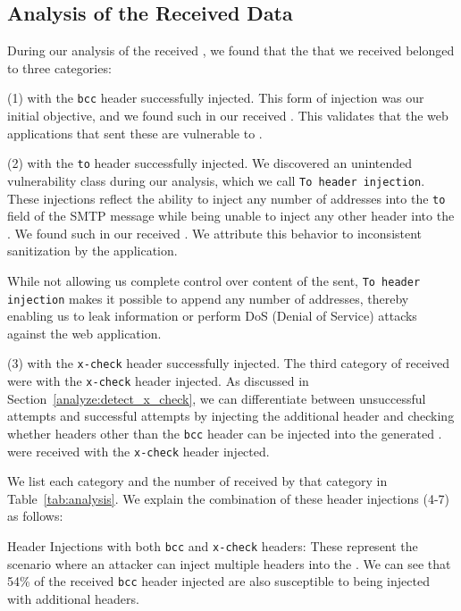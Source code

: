 \subsection{Analysis of the Received \Email Data}
During our analysis of the received \emails, we found that the \emails that we received belonged to three categories:

(1) \Emails with the \texttt{bcc} header successfully injected. This form
of injection was our initial objective, and we found
\ehibcc such \emails in our received \emails. This validates that the
web applications that sent these \emails are vulnerable to \ehi.
	
(2) \Emails with the \texttt{to} header successfully injected. We
discovered an unintended vulnerability class during our analysis,
which we call \texttt{To~header injection}. These injections reflect
the ability to inject any number of \email addresses into the
\texttt{to} field of the SMTP message while being unable to inject any
other header into the \emails. We found \ehito such \emails in our
received \emails. We attribute this behavior to inconsistent
sanitization by the application.
   
While not allowing us complete control over content of the \emails
sent, \texttt{To header injection} makes it possible to append any
number of \email addresses, thereby enabling us to leak information or
perform DoS (Denial of Service) attacks against the web application.
	
(3) \Emails with the \texttt{x-check} header successfully injected. The
third category of \emails received were \emails with the
\texttt{x-check} header injected. As discussed in
Section~\ref{analyze:detect_x_check}, we can differentiate between
unsuccessful attempts and successful attempts by injecting the
additional header and checking whether headers other than the
\texttt{bcc} header can be injected into the generated \email.
\ehixcheck \emails were received with the \texttt{x-check} header
injected.

We list each category and the number of \emails received by that
category in Table~\ref{tab:analysis}. We explain the combination of
these header injections (4-7) as follows:



\Email Header Injections with both \texttt{bcc} and \texttt{x-check}
headers: These represent the scenario where an attacker can inject
multiple headers into the \emails. We can see that 54\% of the
received \texttt{bcc} header injected \emails are also susceptible to
being injected with additional headers.
	
